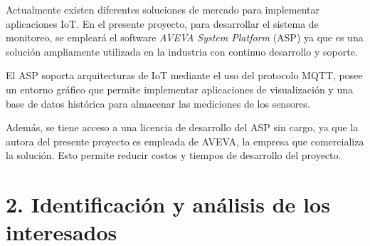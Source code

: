 \documentclass[
11pt, %
]{charter}
\begin{document}
Actualmente existen diferentes soluciones de mercado para implementar aplicaciones IoT. En el presente proyecto, para desarrollar el sistema de monitoreo, se empleará el software \textit{AVEVA System Platform} (ASP) ya que es una solución ampliamente utilizada en la industria con continuo desarrollo y soporte.

El ASP soporta arquitecturas de IoT mediante el uso del protocolo MQTT, posee un entorno gráfico que permite implementar aplicaciones de visualización y una base de datos histórica para almacenar las mediciones de los sensores. 

Además, se tiene acceso a una licencia de desarrollo del ASP sin cargo, ya que la autora del presente proyecto es empleada de AVEVA, la empresa que comercializa la solución. Esto permite reducir costos y tiempos de desarrollo del proyecto.

\section{2. Identificación y análisis de los interesados}
\label{sec:interesados}
\end{document}
